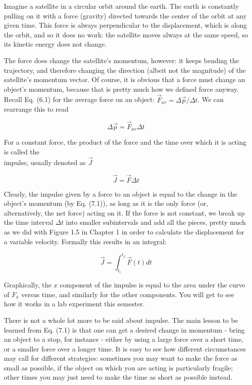 \documentclass[10pt]{article}
\begin{document}
Imagine a satellite in a circular orbit around the earth. The earth is constantly pulling on it with a force (gravity) directed towards the center of the orbit at any given time. This force is always perpendicular to the displacement, which is along the orbit, and so it does no work: the satellite moves always at the same speed, so its kinetic energy does not change.

The force does change the satellite's momentum, however: it keeps bending the trajectory, and therefore changing the direction (albeit not the magnitude) of the satellite's momentum vector. Of course, it is obvious that a force must change an object's momentum, because that is pretty much how we defined force anyway. Recall Eq. (6.1) for the average force on an object: $\vec{F}_{a v}=\Delta \vec{p} / \Delta t$. We can rearrange this to read


\begin{equation*}
\Delta \vec{p}=\vec{F}_{a v} \Delta t \tag{7.1}
\end{equation*}


For a constant force, the product of the force and the time over which it is acting is called the\\
impulse, usually denoted as $\vec{J}$


\begin{equation*}
\vec{J}=\vec{F} \Delta t \tag{7.2}
\end{equation*}


Clearly, the impulse given by a force to an object is equal to the change in the object's momentum (by Eq. (7.1)), as long as it is the only force (or, alternatively, the net force) acting on it. If the force is not constant, we break up the time interval $\Delta t$ into smaller subintervals and add all the pieces, pretty much as we did with Figure 1.5 in Chapter 1 in order to calculate the displacement for a variable velocity. Formally this results in an integral:


\begin{equation*}
\vec{J}=\int_{t_{i}}^{t_{f}} \vec{F}(t) d t \tag{7.3}
\end{equation*}


Graphically, the $x$ component of the impulse is equal to the area under the curve of $F_{x}$ versus time, and similarly for the other components. You will get to see how it works in a lab experiment this semester.

There is not a whole lot more to be said about impulse. The main lesson to be learned from Eq. (7.1) is that one can get a desired change in momentum - bring an object to a stop, for instance - either by using a large force over a short time, or a smaller force over a longer time. It is easy to see how different circumstances may call for different strategies: sometimes you may want to make the force as small as possible, if the object on which you are acting is particularly fragile; other times you may just need to make the time as short as possible instead.
\end{document}
